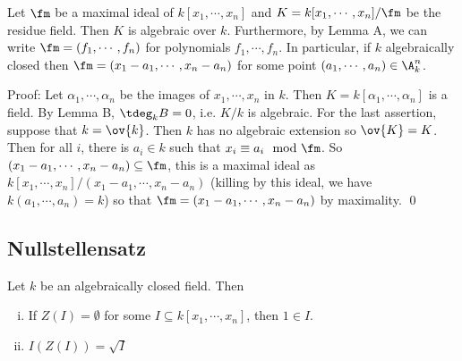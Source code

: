 \begin{thmm}
Let $\fm$ be a maximal ideal of $k[x_1,\cdots,x_n]$ and $K=k[x_1,\cdots,x_n]/\fm$ be the residue field. Then $K$ is algebraic over $k$. Furthermore, by Lemma A, we can write $\fm=(f_1,\cdots,f_n)$ for polynomials $f_1,\cdots,f_n$. In particular, if $k$ algebraically closed then $\fm=(x_1-a_1,\cdots,x_n-a_n)$ for some point $(a_1,\cdots,a_n) \in \A_k^n$. 
\end{thmm}

\noindent Proof: Let $\alpha_1,\cdots,\alpha_n$ be the images of $x_1,\cdots,x_n$ in $k$. Then $K=k[\alpha_1,\cdots,\alpha_n]$ is a field. By Lemma B, $\tdeg_k B=0$, i.e. $K/k$ is algebraic. For the last assertion, suppose that $k=\ov{k}$. Then $k$ has no algebraic extension so $\ov{K}=K$. Then for all $i$, there is $a_i \in k$ such that $x_i \equiv a_i \mod \fm$. So $(x_1-a_1,\cdots,x_n-a_n) \subseteq \fm$, this is a maximal ideal as $k[x_1,\cdots,x_n]/(x_1-a_1,\cdots,x_n-a_n)$ (killing by this ideal, we have $k(a_1,\cdots,a_n)=k$) so that $\fm=(x_1-a_1,\cdots,x_n-a_n)$ by maximality. \qed \\

\subsection{Nullstellensatz}

\begin{thmm}
Let $k$ be an algebraically closed field. Then
\begin{enumerate}[(i)]
\item If $Z(I)=\emptyset$ for some $I \subseteq k[x_1,\cdots,x_n]$, then $1 \in I$.
\item $I(Z(I))=\sqrt{I}$
\end{enumerate}
\end{thmm}

